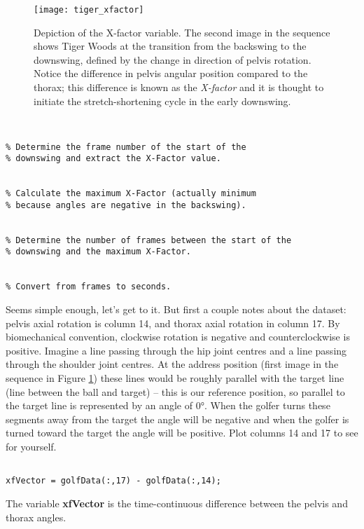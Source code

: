 \documentclass[12pt,a4paper]{article}
\begin{document}
\begin{figure}
\centering
\texttt{[image: tiger\_xfactor]}
\caption{Depiction of the X-factor variable. The second image in the sequence shows Tiger Woods at the transition from the backswing to the downswing, defined by the change in direction of pelvis rotation. Notice the difference in pelvis angular position compared to the thorax; this difference is known as the \emph{X-factor} and it is thought to initiate the stretch-shortening cycle in the early downswing.}
\label{fig:xfact}
\end{figure}
\begin{lstlisting}[style=Matlab-editor]
% Calculate the X-Factor throughout the swing


% Determine the frame number of the start of the 
% downswing and extract the X-Factor value.


% Calculate the maximum X-Factor (actually minimum 
% because angles are negative in the backswing).


% Determine the number of frames between the start of the
% downswing and the maximum X-Factor.


% Convert from frames to seconds.

\end{lstlisting}
Seems simple enough, let's get to it. But first a couple notes about the dataset: pelvis axial rotation is column 14, and thorax axial rotation in column 17.
By biomechanical convention, clockwise rotation is negative and counterclockwise is positive.
Imagine a line passing through the hip joint centres and a line passing through the shoulder joint centres. 
At the address position (first image in the sequence in Figure \ref{fig:xfact}) these lines would be roughly parallel with the target line (line between the ball and target) – this is our reference position, so parallel to the target line is represented by an angle of 0°. 
When the golfer turns these segments away from the target the angle will be negative and when the golfer is turned toward the target the angle will be positive.
Plot columns 14 and 17 to see for yourself.

\begin{lstlisting}[style=Matlab-editor]
% Calculate the X-Factor throughout the swing

xfVector = golfData(:,17) - golfData(:,14);

\end{lstlisting}

The variable \textbf{xfVector} is the time-continuous difference between the pelvis and thorax angles.
\end{document}

